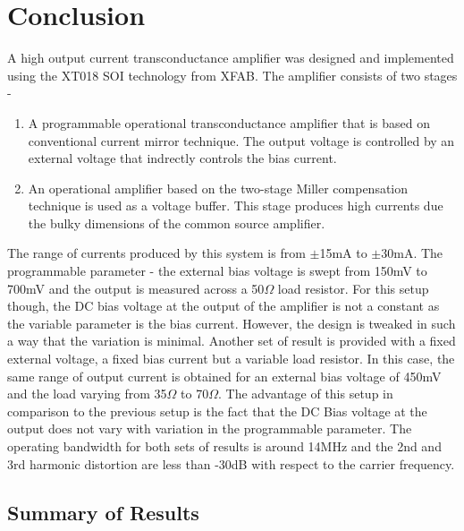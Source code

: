 \chapter{Conclusion}
A high output current transconductance amplifier was designed and implemented using the XT018 SOI technology from XFAB. The amplifier consists of two stages - 
\begin{enumerate}
\item A programmable operational transconductance amplifier that is based on conventional current mirror technique. The output voltage is controlled by an external voltage that indrectly controls the bias current.
\item An operational amplifier based on the two-stage Miller compensation technique is used as a voltage buffer. This stage produces high currents due the bulky dimensions of the common source amplifier.
\end{enumerate}
The range of currents produced by this system is from $\pm$15mA to $\pm$30mA. The programmable parameter - the external bias voltage is swept from 150mV to 700mV and the output is measured across a 50$\Omega$ load resistor. For this setup though, the DC bias voltage at the output of the amplifier is not a constant as the variable parameter is the bias current. However, the design is tweaked in such a way that the variation is minimal. Another set of result is provided with a fixed external voltage, a fixed bias current but a variable load resistor. In this case, the same range of output current is obtained for an external bias voltage of 450mV and the load varying from 35$\Omega$ to 70$\Omega$. The advantage of this setup in comparison to the previous setup is the fact that the DC Bias voltage at the output does not vary with variation in the programmable parameter. The operating bandwidth for both sets of results is around 14MHz and the 2nd and 3rd harmonic distortion are less than -30dB with respect to the carrier frequency.

\section{Summary of Results}

